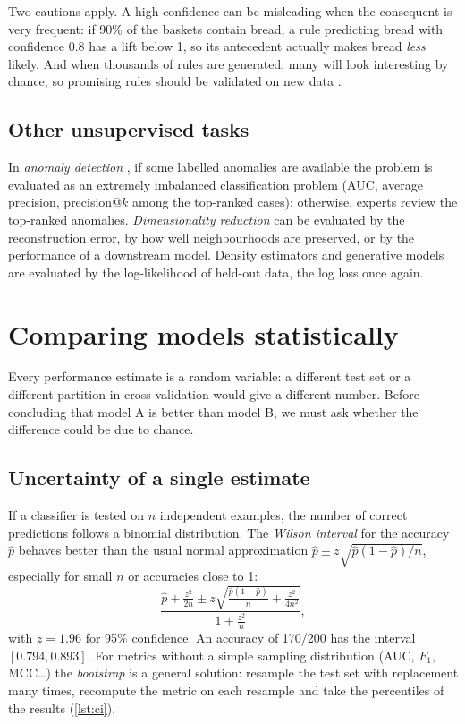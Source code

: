 Two cautions apply. A high confidence can be misleading when the consequent is very frequent:
if 90\% of the baskets contain bread, a rule predicting bread with confidence 0.8 has a lift
below 1, so its antecedent actually makes bread \emph{less} likely. And when thousands of rules
are generated, many will look interesting by chance, so promising rules should be validated on
new data \citep{tan2004selecting,han2011data}.

\subsection{Other unsupervised tasks}

In \emph{anomaly detection} \citep{chandola2009anomaly}, if some labelled anomalies are
available the problem is evaluated as an extremely imbalanced classification problem (AUC,
average precision, precision@$k$ among the top-ranked cases); otherwise, experts review the
top-ranked anomalies. \emph{Dimensionality reduction} can be evaluated by the reconstruction
error, by how well neighbourhoods are preserved, or by the performance of a downstream model.
Density estimators and generative models are evaluated by the log-likelihood of held-out data,
the log loss once again.

\section{Comparing models statistically}\label{sec:stats}

Every performance estimate is a random variable: a different test set or a different partition
in cross-validation would give a different number. Before concluding that model A is better than
model B, we must ask whether the difference could be due to chance.

\subsection{Uncertainty of a single estimate}

If a classifier is tested on $n$ independent examples, the number of correct predictions follows
a binomial distribution. The \emph{Wilson interval} \citep{wilson1927probable} for the accuracy
$\hat p$ behaves better than the usual normal approximation $\hat p\pm z\sqrt{\hat p(1-\hat p)/n}$,
especially for small $n$ or accuracies close to 1:
\begin{equation}
  \frac{\hat p+\frac{z^2}{2n}\pm z\sqrt{\frac{\hat p(1-\hat p)}{n}+\frac{z^2}{4n^2}}}{1+\frac{z^2}{n}},
\end{equation}
with $z=1.96$ for 95\% confidence. An accuracy of 170/200 has the interval $[0.794, 0.893]$. For
metrics without a simple sampling distribution (AUC, $F_1$, MCC\dots) the \emph{bootstrap}
\citep{efron1993introduction} is a general solution: resample the test set with replacement
many times, recompute the metric on each resample and take the percentiles of the results
(\cref{lst:ci}).

